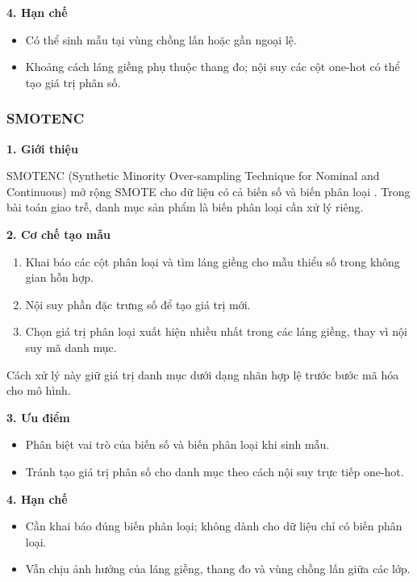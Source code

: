 \documentclass[a4paper]{article}
\begin{document}
\noindent\textbf{4. Hạn chế}\par
\begin{itemize}
    \item Có thể sinh mẫu tại vùng chồng lấn hoặc gần ngoại lệ.
    \item Khoảng cách láng giềng phụ thuộc thang đo; nội suy các cột one-hot có thể tạo giá trị phân số.
\end{itemize}

\subsubsection{SMOTENC}
\noindent\textbf{1. Giới thiệu}\par
SMOTENC (Synthetic Minority Over-sampling Technique for Nominal and Continuous) mở rộng SMOTE cho dữ liệu có cả biến số và biến phân loại \cite{smotencTheory}. Trong bài toán giao trễ, danh mục sản phẩm là biến phân loại cần xử lý riêng.

\noindent\textbf{2. Cơ chế tạo mẫu}\par
\begin{enumerate}
    \item Khai báo các cột phân loại và tìm láng giềng cho mẫu thiểu số trong không gian hỗn hợp.
    \item Nội suy phần đặc trưng số để tạo giá trị mới.
    \item Chọn giá trị phân loại xuất hiện nhiều nhất trong các láng giềng, thay vì nội suy mã danh mục.
\end{enumerate}
Cách xử lý này giữ giá trị danh mục dưới dạng nhãn hợp lệ trước bước mã hóa cho mô hình.

\noindent\textbf{3. Ưu điểm}\par
\begin{itemize}
    \item Phân biệt vai trò của biến số và biến phân loại khi sinh mẫu.
    \item Tránh tạo giá trị phân số cho danh mục theo cách nội suy trực tiếp one-hot.
\end{itemize}

\noindent\textbf{4. Hạn chế}\par
\begin{itemize}
    \item Cần khai báo đúng biến phân loại; không dành cho dữ liệu chỉ có biến phân loại.
    \item Vẫn chịu ảnh hưởng của láng giềng, thang đo và vùng chồng lấn giữa các lớp.
\end{itemize}
\end{document}
